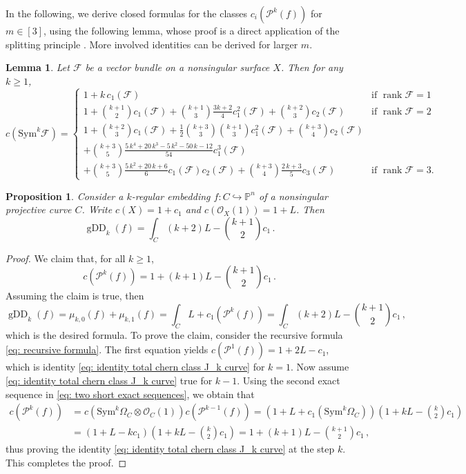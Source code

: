 \documentclass[11pt,reqno]{amsart}
\numberwithin{equation}{section}
\theoremstyle{plain}
\numberwithin{theorem}{section}
\newtheorem{proposition}[theorem]{Proposition}
\newtheorem{lemma}[theorem]{Lemma}
\theoremstyle{definition}
\renewcommand{\P}{\mathbb{P}}
\newcommand{\FF}{\mathcal{F}}
\newcommand{\OO}{\mathcal{O}}
\newcommand{\PP}{\mathcal{P}}
\newcommand{\gDD}{\operatorname{gDD}}
\newcommand{\rank}{\operatorname{rank}}
\begin{document}
In the following, we derive closed formulas for the classes $c_i(\PP^k(f))$ for $m\in[3]$, using the following lemma, whose proof is a direct application of the splitting principle \cite[Remark 3.2.3]{fulton1998intersection}. More involved identities can be derived for larger $m$.

\begin{lemma}\label{lem: chern classes symmetric power vector bundle small rank}
Let $\FF$ be a vector bundle on a nonsingular surface $X$. Then for any $k\ge 1$,
\[
c(\mathrm{Sym}^k\FF) =
\begin{cases}
    1+k\,c_1(\FF) & \text{if $\rank\FF=1$}\\[3pt]
    1+\binom{k+1}{2}c_1(\FF)+\binom{k+1}{3}\frac{3k+2}{4}c_1^2(\FF)+\binom{k+2}{3}c_2(\FF) & \text{if $\rank\FF=2$}\\[3pt]
    1+\binom{k+2}{3}c_1(\FF)+\frac{1}{2}\binom{k+3}{3}\binom{k+1}{3}c_1^2(\FF)+\binom{k+3}{4}c_2(\FF) & \\[2pt]
    +\binom{k+3}{5}\frac{5\,k^4+20\,k^3-5\,k^2-50\,k-12}{54}c_1^3(\FF) & \\[2pt]
    +\binom{k+3}{5}\frac{5\,k^2+20\,k+6}{6}c_1(\FF)c_2(\FF)+\binom{k+3}{4}\frac{2\,k+3}{5}c_3(\FF) & \text{if $\rank\FF=3$.}
\end{cases}
\]
\end{lemma}

\begin{proposition}\label{prop: gEDD k-regular curve}
Consider a $k$-regular embedding $f\colon C\hookrightarrow\P^n$ of a nonsingular projective curve $C$. Write $c(X)=1+c_1$ and $c(\OO_X(1))=1+L$. Then
\begin{equation}\label{eq: gEDD k-regular curve}
    \gDD_k(f) = \int_C(k+2)L-\binom{k+1}{2}c_1\,.
\end{equation}
\end{proposition}
\begin{proof}
We claim that, for all $k\ge 1$,
\begin{equation}\label{eq: identity total chern class J_k curve}
c(\PP^k(f)) = 1+(k+1)L-\binom{k+1}{2}c_1\,.
\end{equation}
Assuming the claim is true, then
\[
\gDD_k(f) = \mu_{k,0}(f)+\mu_{k,1}(f) = \int_C L+c_1(\PP^k(f)) = \int_C (k+2)L-\binom{k+1}{2}c_1\,,
\]
which is the desired formula.
To prove the claim, consider the recursive formula \eqref{eq: recursive formula}. The first equation yields $c(\PP^1(f)) = 1 + 2L-c_1$, which is identity \eqref{eq: identity total chern class J_k curve} for $k=1$. Now assume \eqref{eq: identity total chern class J_k curve} true for $k-1$. Using the second exact sequence in \eqref{eq: two short exact sequences}, we obtain that
\begin{align*}
c(\PP^k(f)) &= c(\mathrm{Sym}^k\Omega_C\otimes\OO_C(1))c(\PP^{k-1}(f)) = (1+L+c_1(\mathrm{Sym}^k\Omega_C))\left(1+kL-\binom{k}{2}c_1\right)\\
&= (1+L-kc_1)\left(1+kL-\binom{k}{2}c_1\right) = 1+(k+1)L-\binom{k+1}{2}c_1\,,
\end{align*}
thus proving the identity \eqref{eq: identity total chern class J_k curve} at the step $k$. This completes the proof.
\end{proof}
\end{document}
